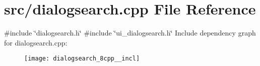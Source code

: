 \section{src/dialogsearch.cpp File Reference}
\label{dialogsearch_8cpp}
{\ttfamily \#include \char`\"{}dialogsearch.\+h\char`\"{}}\newline
{\ttfamily \#include \char`\"{}ui\+\_\+dialogsearch.\+h\char`\"{}}\newline
Include dependency graph for dialogsearch.\+cpp\+:\nopagebreak
\begin{figure}[H]
\begin{center}
\leavevmode
\texttt{[image: dialogsearch\_8cpp\_\_incl]}
\end{center}
\end{figure}
